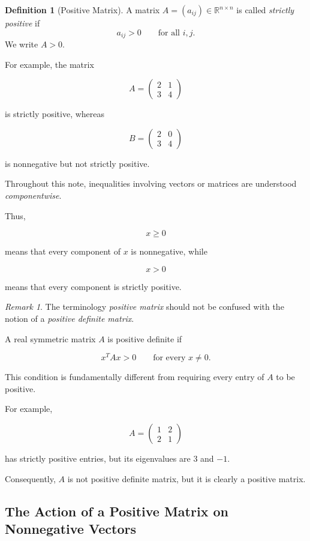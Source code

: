 \documentclass[11pt,a4paper]{article}
\theoremstyle{definition}
\newtheorem{definition}[theorem]{Definition}
\theoremstyle{remark}
\newtheorem{remark}[theorem]{Remark}
\begin{document}
\begin{definition}[Positive Matrix]
A matrix $A=(a_{ij})\in\mathbb{R}^{n\times n}$
is called \emph{strictly positive} if
\[
a_{ij}>0
\qquad
\text{for all }i,j.
\]
We write $A>0$.
\end{definition}

For example, the matrix

\[
A=
\begin{pmatrix}
2&1\\
3&4
\end{pmatrix}
\]

is strictly positive, whereas

\[
B=
\begin{pmatrix}
2&0\\
3&4
\end{pmatrix}
\]

is nonnegative but not strictly positive.

Throughout this note, inequalities involving
vectors or matrices are understood
\emph{componentwise}.

Thus,

\[
x\geq0
\]

means that every component of $x$ is
nonnegative, while

\[
x>0
\]

means that every component is strictly
positive.

\begin{remark}
The terminology \emph{positive matrix}
should not be confused with the notion
of a \emph{positive definite matrix}.

A real symmetric matrix $A$ is positive
definite if

\[
x^TAx>0
\qquad
\text{for every }x\neq0.
\]

This condition is fundamentally different
from requiring every entry of $A$
to be positive.

For example,

\[
A=
\begin{pmatrix}
1&2\\
2&1
\end{pmatrix}
\]

has strictly positive entries, but its
eigenvalues are $3$ and $-1$.

Consequently, $A$ is not positive definite matrix, but it is clearly a positive matrix.
\end{remark}


\subsection{The Action of a Positive Matrix
on Nonnegative Vectors}
\end{document}
